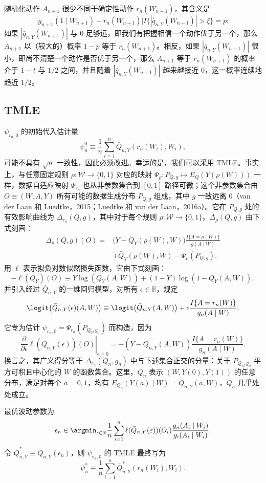 随机化动作 $A_{n+1}$ 很少不同于确定性动作 $r_n(W_{n+1})$，其含义是
\begin{equation}
 \bigl|g_{n+1}(1\mid W_{n+1})-r_n(W_{n+1})\bigr|
 I\{|\bar q_{n,Y}(W_{n+1})|>\xi\}=p:
 \tag{24.4}
\end{equation}
如果 $|\bar q_{n,Y}(W_{n+1})|$ 与 $0$ 足够远，即我们有把握相信一个动作优于另一个，那么 $A_{n+1}$ 以（较大的）概率 $1-p$ 等于 $r_n(W_{n+1})$。相反，如果 $|\bar q_{n,Y}(W_{n+1})|$ 很小，即尚不清楚一个动作是否优于另一个，那么 $A_{n+1}$ 等于 $r_n(W_{n+1})$ 的概率介于 $1-t$ 与 $1/2$ 之间，并且随着 $|\bar q_{n,Y}(W_{n+1})|$ 越来越接近 $0$，这一概率连续地趋近 $1/2$。

\subsection{TMLE}

$\psi_{r_n,0}$ 的初始代入估计量
\[
 \psi_n^0\equiv\frac1n\sum_{i=1}^n\bar Q_{n,Y}(r_n(W_i),W_i),
\]
可能不具有 $\sqrt n$ 一致性，因此必须改进。幸运的是，我们可以采用 TMLE。事实上，与任意固定规则 $\rho:\mathcal W\to\{0,1\}$ 对应的映射 $\Psi_\rho:P_{Q,g}\mapsto E_Q(Y(\rho(W)))$ 一样，数据自适应映射 $\Psi_{r_n}$ 也从非参数集合到 $[0,1]$ 路径可微；这个非参数集合由 $O\equiv(W,A,Y)$ 所有可能的数据生成分布 $P_{Q,g}$ 组成，其中 $g$ 一致远离 $0$（van der Laan 和 Luedtke，2015；Luedtke 和 van der Laan，2016a）。它在 $P_{Q,g}$ 处的有效影响曲线为 $\Delta_{r_n}(Q,g)$，其中对于每个规则 $\rho:\mathcal W\to\{0,1\}$，$\Delta_\rho(Q,g)$ 由下式刻画：
\begin{equation}
 \begin{aligned}
 \Delta_\rho(Q,g)(O)={}&\bigl(Y-\bar Q_Y(\rho(W),W)\bigr)
 \frac{I\{A=\rho(W)\}}{g(A\mid W)}\\
 &+\bar Q_Y(\rho(W),W)-\Psi_\rho(P_{Q,g}).
 \end{aligned}
 \tag{24.5}
\end{equation}
用 $\ell$ 表示拟负对数似然损失函数，它由下式刻画：
\[
 -\ell(\bar Q_Y)(O)\equiv Y\log(\bar Q_Y(A,W))
 +(1-Y)\log(1-\bar Q_Y(A,W)),
\]
并引入经过 $\bar Q_{n,Y}$ 的一维回归模型，对所有 $\epsilon\in\mathbb R$，规定
\[
 \logit\bigl(\bar Q_{n,Y}(\epsilon)(A,W)\bigr)
 \equiv\logit\bigl(\bar Q_{n,Y}(A,W)\bigr)
 +\epsilon\frac{I\{A=r_n(W)\}}{g_n(A\mid W)}.
\]
它专为估计 $\psi_{r_n,0}=\Psi_{r_n}(P_{Q_0,g_n})$ 而构造，因为
\[
 \left.\frac{\partial}{\partial\epsilon}\ell(\bar Q_{n,Y}(\epsilon))(O)\right|_{\epsilon=0}
 =-(Y-\bar Q_{n,Y}(A,W))\frac{I\{A=r_n(W)\}}{g_n(A\mid W)}.
\]
换言之，其广义得分等于 $\Delta_{r_n}(Q_n,g_n)$ 中与下述集合正交的分量：关于 $P_{Q_n,g_n}$ 平方可积且中心化的 $W$ 的函数集合。这里，$Q_n$ 表示 $(W,Y(0),Y(1))$ 的任意分布，满足对每个 $a=0,1$，均有 $E_{Q_n}(Y(a)\mid W)=\bar Q_{n,Y}(a,W)$，$Q_n$ 几乎处处成立。

最优波动参数为
\[
 \epsilon_n\in\argmin_{\epsilon\in\mathbb R}\frac1n\sum_{i=1}^n
 \ell(\bar Q_{n,Y}(\varepsilon))(O_i)\frac{g_n(A_i\mid W_i)}{g_i(A_i\mid W_i)}.
\]
令 $\bar Q_{n,Y}^*\equiv\bar Q_{n,Y}(\epsilon_n)$，则 $\psi_{r_n,0}$ 的 TMLE 最终写为
\[
 \psi_n^*\equiv\frac1n\sum_{i=1}^n\bar Q_{n,Y}^*(r_n(W_i),W_i).
\]
